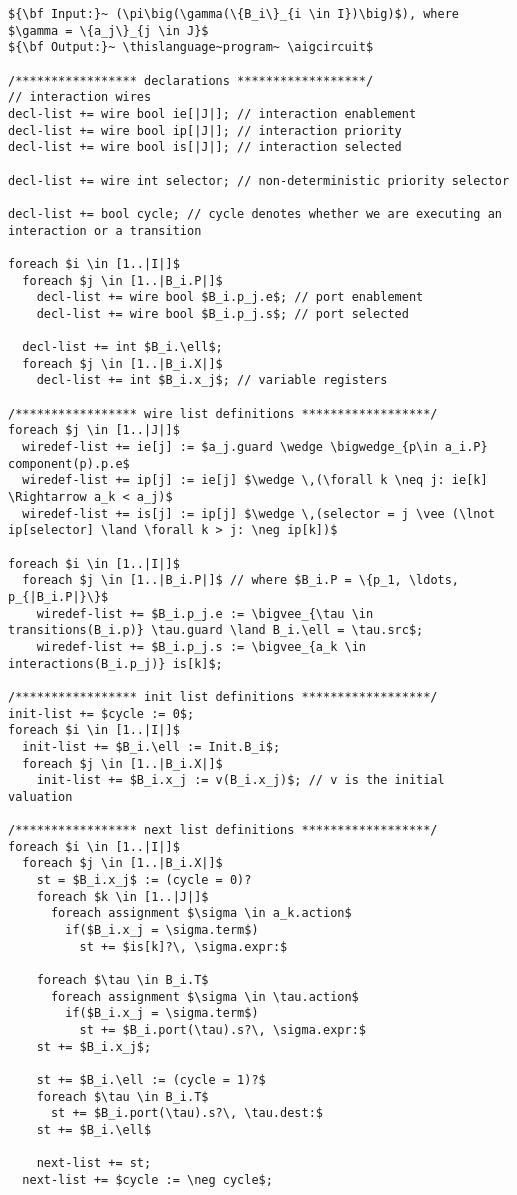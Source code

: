 \begin{lstlisting}[caption=BIP to \thislanguage~transformation algorithm,label=alg:bip2aig,float=bt]
${\bf Input:}~ (\pi\big(\gamma(\{B_i\}_{i \in I})\big)$), where $\gamma = \{a_j\}_{j \in J}$
${\bf Output:}~ \thislanguage~program~ \aigcircuit$

/***************** declarations ******************/
// interaction wires
decl-list += wire bool ie[|J|]; // interaction enablement 
decl-list += wire bool ip[|J|]; // interaction priority
decl-list += wire bool is[|J|]; // interaction selected

decl-list += wire int selector; // non-deterministic priority selector

decl-list += bool cycle; // cycle denotes whether we are executing an interaction or a transition 

foreach $i \in [1..|I|]$
  foreach $j \in [1..|B_i.P|]$ 
    decl-list += wire bool $B_i.p_j.e$; // port enablement
    decl-list += wire bool $B_i.p_j.s$; // port selected
  
  decl-list += int $B_i.\ell$;
  foreach $j \in [1..|B_i.X|]$ 
    decl-list += int $B_i.x_j$; // variable registers

/***************** wire list definitions ******************/
foreach $j \in [1..|J|]$
  wiredef-list += ie[j] := $a_j.guard \wedge \bigwedge_{p\in a_i.P} component(p).p.e$ 
  wiredef-list += ip[j] := ie[j] $\wedge \,(\forall k \neq j: ie[k] \Rightarrow a_k < a_j)$ 
  wiredef-list += is[j] := ip[j] $\wedge \,(selector = j \vee (\lnot ip[selector] \land \forall k > j: \neg ip[k])$   

foreach $i \in [1..|I|]$
  foreach $j \in [1..|B_i.P|]$ // where $B_i.P = \{p_1, \ldots, p_{|B_i.P|}\}$ 
    wiredef-list += $B_i.p_j.e := \bigvee_{\tau \in transitions(B_i.p)} \tau.guard \land B_i.\ell = \tau.src$; 
    wiredef-list += $B_i.p_j.s := \bigvee_{a_k \in interactions(B_i.p_j)} is[k]$; 

/***************** init list definitions ******************/
init-list += $cycle := 0$; 
foreach $i \in [1..|I|]$
  init-list += $B_i.\ell := Init.B_i$; 
  foreach $j \in [1..|B_i.X|]$
    init-list += $B_i.x_j := v(B_i.x_j)$; // v is the initial valuation

/***************** next list definitions ******************/
foreach $i \in [1..|I|]$
  foreach $j \in [1..|B_i.X|]$ 
    st = $B_i.x_j$ := (cycle = 0)?
    foreach $k \in [1..|J|]$
      foreach assignment $\sigma \in a_k.action$
        if($B_i.x_j = \sigma.term$)
          st += $is[k]?\, \sigma.expr:$
    
    foreach $\tau \in B_i.T$ 
      foreach assignment $\sigma \in \tau.action$
        if($B_i.x_j = \sigma.term$)
          st += $B_i.port(\tau).s?\, \sigma.expr:$
    st += $B_i.x_j$; 
    
    st += $B_i.\ell := (cycle = 1)?$
    foreach $\tau \in B_i.T$
      st += $B_i.port(\tau).s?\, \tau.dest:$
    st += $B_i.\ell$    
    
    next-list += st;  
  next-list += $cycle := \neg cycle$; 
\end{lstlisting}


